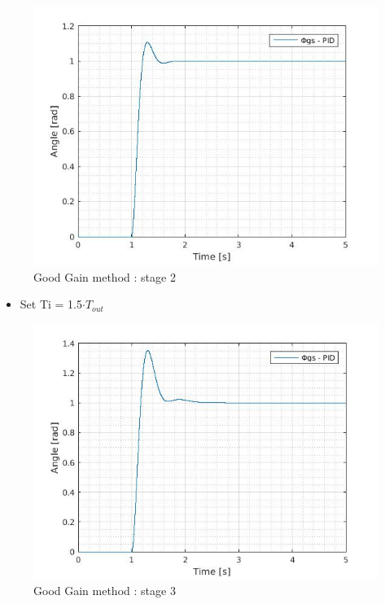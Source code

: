   \begin{figure}[H]
    \centering
    \includegraphics[scale=0.4]{figures/GG2.jpg}
    \caption[LABEL] {Good Gain method : stage 2} 
  \end{figure}
    
    
\begin{itemize}
  \item Set Ti = 1.5$\cdot T_{out}$
\end{itemize}
  
  \begin{figure}[H]
    \centering
    \includegraphics[scale=0.4]{figures/GG3.jpg}
    \caption[LABEL] {Good Gain method : stage 3} 
  \end{figure}
    
